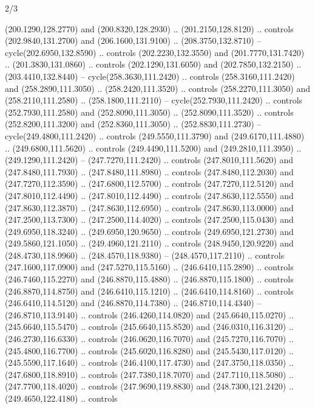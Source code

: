 \begin{flagdescription}{2/3}
\begin{scope}[xshift=0.5\flaglength,yshift=0.5\flagwidth,scale=\flagwidth/259.2]
\begin{scope}[y=0.8pt, x=0.8pt, yscale=-1,shift={(-243,-162)}]
      (200.1290,128.2770) and (200.8320,128.2930) .. (201.2150,128.8120) .. controls
      (202.9840,131.2700) and (206.1600,131.9100) .. (208.3750,132.8710) --
      cycle(202.6950,132.8590) .. controls (202.2230,132.3550) and
      (201.7770,131.7420) .. (201.3830,131.0860) .. controls (202.1290,131.6050) and
      (202.7850,132.2150) .. (203.4410,132.8440) -- cycle(258.3630,111.2420) ..
      controls (258.3160,111.2420) and (258.2890,111.3050) .. (258.2420,111.3520) ..
      controls (258.2270,111.3050) and (258.2110,111.2580) .. (258.1800,111.2110) --
      cycle(252.7930,111.2420) .. controls (252.7930,111.2580) and
      (252.8090,111.3050) .. (252.8090,111.3520) .. controls (252.8200,111.3200) and
      (252.8360,111.3050) .. (252.8830,111.2730) -- cycle(249.4800,111.2420) ..
      controls (249.5550,111.3790) and (249.6170,111.4880) .. (249.6800,111.5620) ..
      controls (249.4490,111.5200) and (249.2810,111.3950) .. (249.1290,111.2420) --
      (247.7270,111.2420) .. controls (247.8010,111.5620) and (247.8480,111.7930) ..
      (247.8480,111.8980) .. controls (247.8480,112.2030) and (247.7270,112.3590) ..
      (247.6800,112.5700) .. controls (247.7270,112.5120) and (247.8010,112.4490) ..
      (247.8010,112.4490) .. controls (247.8630,112.5550) and (247.8630,112.3870) ..
      (247.8630,112.6950) .. controls (247.8630,113.0000) and (247.2500,113.7300) ..
      (247.2500,114.4020) .. controls (247.2500,115.0430) and (249.6950,118.3240) ..
      (249.6950,120.9650) .. controls (249.6950,121.2730) and (249.5860,121.1050) ..
      (249.4960,121.2110) .. controls (248.9450,120.9220) and (248.4730,118.9960) ..
      (248.4570,118.9380) -- (248.4570,117.2110) .. controls (247.1600,117.0900) and
      (247.5270,115.5160) .. (246.6410,115.2890) .. controls (246.7460,115.2270) and
      (246.8870,115.4880) .. (246.8870,115.1800) .. controls (246.8870,114.8750) and
      (246.6410,115.1210) .. (246.6410,114.8160) .. controls (246.6410,114.5120) and
      (246.8870,114.7380) .. (246.8710,114.4340) -- (246.8710,113.9140) .. controls
      (246.4260,114.0820) and (245.6640,115.0270) .. (245.6640,115.5470) .. controls
      (245.6640,115.8520) and (246.0310,116.3120) .. (246.2730,116.6330) .. controls
      (246.0620,116.7070) and (245.7270,116.7070) .. (245.4800,116.7700) .. controls
      (245.6020,116.8280) and (245.5430,117.0120) .. (245.5590,117.1640) .. controls
      (246.4100,117.4730) and (247.3750,118.0350) .. (247.6800,118.8910) .. controls
      (247.7380,118.7070) and (247.7110,118.5080) .. (247.7700,118.4020) .. controls
      (247.9690,119.8830) and (248.7300,121.2420) .. (249.4650,122.4180) .. controls

\end{scope}
\end{scope}
\end{flagdescription}
